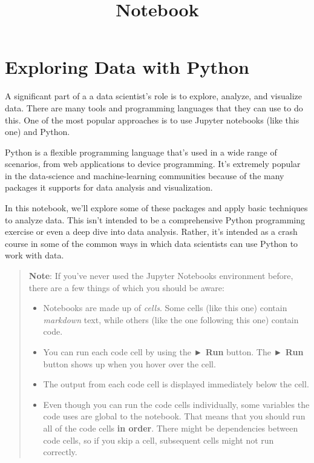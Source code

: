 \documentclass[11pt]{article}
\title{Notebook}
\providecommand{\tightlist}{%
      \setlength{\itemsep}{0pt}\setlength{\parskip}{0pt}}
\begin{document}
    
    \maketitle
    
    

    
    \hypertarget{exploring-data-with-python}{%
\section{Exploring Data with Python}\label{exploring-data-with-python}}

A significant part of a a data scientist's role is to explore, analyze,
and visualize data. There are many tools and programming languages that
they can use to do this. One of the most popular approaches is to use
Jupyter notebooks (like this one) and Python.

Python is a flexible programming language that's used in a wide range of
scenarios, from web applications to device programming. It's extremely
popular in the data-science and machine-learning communities because of
the many packages it supports for data analysis and visualization.

In this notebook, we'll explore some of these packages and apply basic
techniques to analyze data. This isn't intended to be a comprehensive
Python programming exercise or even a deep dive into data analysis.
Rather, it's intended as a crash course in some of the common ways in
which data scientists can use Python to work with data.

\begin{quote}
\textbf{Note}: If you've never used the Jupyter Notebooks environment
before, there are a few things of which you should be aware:

\begin{itemize}
\tightlist
\item
  Notebooks are made up of \emph{cells}. Some cells (like this one)
  contain \emph{markdown} text, while others (like the one following
  this one) contain code.
\item
  You can run each code cell by using the \textbf{► Run} button. The
  \textbf{► Run} button shows up when you hover over the cell.
\item
  The output from each code cell is displayed immediately below the
  cell.
\item
  Even though you can run the code cells individually, some variables
  the code uses are global to the notebook. That means that you should
  run all of the code cells \textbf{in order}. There might be
  dependencies between code cells, so if you skip a cell, subsequent
  cells might not run correctly.
\end{itemize}
\end{quote}
\end{document}
